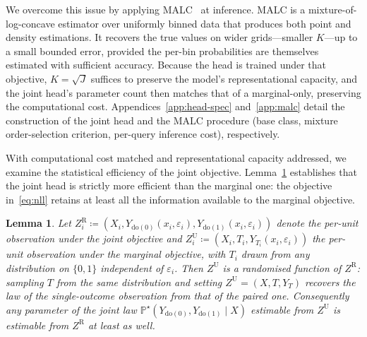 \documentclass[11pt]{article}
\newtheorem{lemma}[theorem]{Lemma}
\newcommand{\PP}{\mathbb{P}}
\begin{document}
We overcome this issue by applying MALC~\citep{danisman2026malc} at inference. MALC is a mixture-of-log-concave estimator over uniformly binned data that
produces both point and density estimations. It recovers the true values on wider grids—smaller $K$—up to a small bounded error, provided the per-bin probabilities are themselves estimated with sufficient accuracy. Because the head is trained under
that objective, $K=\sqrt{J}$ suffices to preserve the model's representational capacity, and the joint head's parameter count then matches that of a marginal-only, preserving the computational cost. Appendices~\ref{app:head-spec} and~\ref{app:malc} detail the construction of the joint head and the MALC procedure (base class, mixture order-selection criterion, per-query inference cost), respectively.

With computational cost matched and representational capacity addressed, we examine the statistical efficiency of the joint objective. Lemma~\ref{lem:sufficiency} establishes that the joint head is strictly more efficient than the marginal one: the objective in~\eqref{eq:nll} retains at least all the information available to the marginal objective. \\


\begin{lemma}
\label{lem:sufficiency}
Let $Z_i^{\mathrm{R}} \coloneqq (X_i, Y_{\mathrm{do}(0)}(x_i, \varepsilon_i),
Y_{\mathrm{do}(1)}(x_i, \varepsilon_i))$ denote the per-unit observation
under the joint objective and
$Z_i^{\mathrm{U}} \coloneqq (X_i, T_i, Y_{T_i}(x_i, \varepsilon_i))$
the per-unit observation under the marginal objective, with $T_i$
drawn from any distribution on $\{0, 1\}$ independent of
$\varepsilon_i$. Then $Z^{\mathrm{U}}$ is a randomised function of
$Z^{\mathrm{R}}$: sampling $T$ from the same distribution and setting
$Z^{\mathrm{U}} = (X, T, Y_T)$ recovers the law of the single-outcome
observation from that of the paired one. Consequently any parameter
of the joint law
$\PP^\star(Y_{\mathrm{do}(0)}, Y_{\mathrm{do}(1)} \mid X)$ estimable
from $Z^{\mathrm{U}}$ is estimable from $Z^{\mathrm{R}}$ at least as
well.
\end{lemma}
\end{document}
